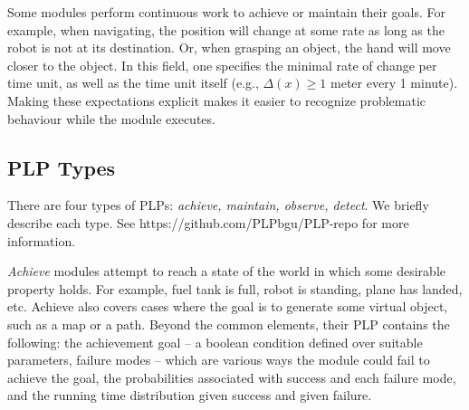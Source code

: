 \documentclass[ 5p, 12pt, times, twocolumn, sort&compress ]{elsarticle}
\begin{document}
  Some modules perform continuous work to achieve or maintain their goals.
For example, when navigating, the position will change at some rate as long as the robot is not at its destination.
Or, when grasping an object, the hand will move closer to the object. In this field, one specifies
the minimal rate of change per time unit, as well
as the time unit itself (e.g., $\Delta(x)\geq 1$ meter every 1 minute).
Making these expectations explicit makes it easier to recognize problematic behaviour while the module executes.


\subsection{PLP Types}
There are four types of PLPs: {\em achieve, maintain, observe, detect}.
We briefly describe each type. 
See https://github.com/PLPbgu/PLP-repo for more information.


{\em Achieve\/} modules attempt to reach a state of the world in which some desirable property holds. For example,
fuel tank is full, robot is standing, plane has landed, etc. Achieve also covers cases where the goal
is to generate some virtual object, such as a map or a path.
Beyond the common elements, their PLP contains
the following:  the achievement goal -- a boolean condition defined over suitable parameters, 
failure modes -- which are various ways the module could fail to achieve the goal, the probabilities associated with
success and each failure mode, and the running time distribution given success and given failure. 




\end{document}
